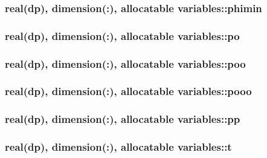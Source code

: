 \hypertarget{classvariables_a73f00dce58a2515ab0c87e5ff205479c}{
\subsubsection[{phimin}]{\setlength{\rightskip}{0pt plus 5cm}real(dp), dimension(\-:), allocatable variables\-::phimin}}\label{classvariables_a73f00dce58a2515ab0c87e5ff205479c}
\hypertarget{classvariables_aba75282f2242d09c60d5f407f42aa8c6}{
\subsubsection[{po}]{\setlength{\rightskip}{0pt plus 5cm}real(dp), dimension(\-:), allocatable variables\-::po}}\label{classvariables_aba75282f2242d09c60d5f407f42aa8c6}
\hypertarget{classvariables_a2f189f01a368381032270b6c0a9edf2e}{
\subsubsection[{poo}]{\setlength{\rightskip}{0pt plus 5cm}real(dp), dimension(\-:), allocatable variables\-::poo}}\label{classvariables_a2f189f01a368381032270b6c0a9edf2e}
\hypertarget{classvariables_a5150120fa0257c929b9f53ba329697d8}{
\subsubsection[{pooo}]{\setlength{\rightskip}{0pt plus 5cm}real(dp), dimension(\-:), allocatable variables\-::pooo}}\label{classvariables_a5150120fa0257c929b9f53ba329697d8}
\hypertarget{classvariables_a25e1a833edf25885416779bdf0a8b7e7}{
\subsubsection[{pp}]{\setlength{\rightskip}{0pt plus 5cm}real(dp), dimension(\-:), allocatable variables\-::pp}}\label{classvariables_a25e1a833edf25885416779bdf0a8b7e7}
\hypertarget{classvariables_a29c960024498876d106d12750eae8696}{
\subsubsection[{t}]{\setlength{\rightskip}{0pt plus 5cm}real(dp), dimension(\-:), allocatable variables\-::t}}\label{classvariables_a29c960024498876d106d12750eae8696}
